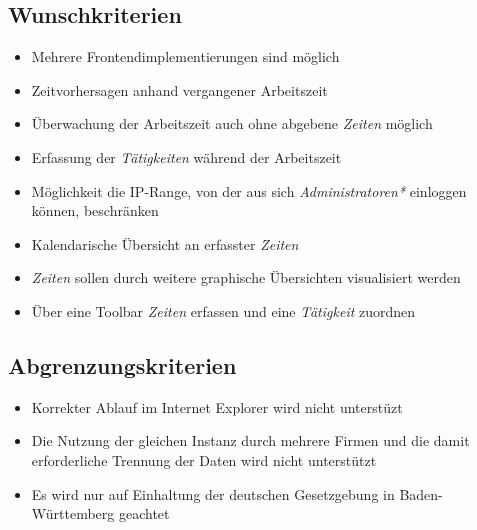 \subsection{Wunschkriterien}

\begin{itemize}
	\item Mehrere Frontendimplementierungen sind möglich
	\item Zeitvorhersagen anhand vergangener Arbeitszeit
	\item Überwachung der Arbeitszeit auch ohne abgebene \emph{Zeiten} möglich
	\item Erfassung der \emph{Tätigkeiten} während der Arbeitszeit
	\item Möglichkeit die IP-Range, von der aus sich \emph{Administratoren*} einloggen können, beschränken
	\item Kalendarische Übersicht an erfasster \emph{Zeiten}
	\item \emph{Zeiten} sollen durch weitere graphische Übersichten visualisiert werden
	\item Über eine Toolbar \emph{Zeiten} erfassen und eine \emph{Tätigkeit} zuordnen
\end{itemize}


\subsection{Abgrenzungskriterien}
\begin{itemize}
	\item Korrekter Ablauf im Internet Explorer wird nicht unterstüzt
	\item Die Nutzung der gleichen Instanz durch mehrere Firmen und die damit erforderliche Trennung der Daten wird nicht unterstützt
	\item Es wird nur auf Einhaltung der deutschen Gesetzgebung in Baden-Württemberg geachtet
\end{itemize}
